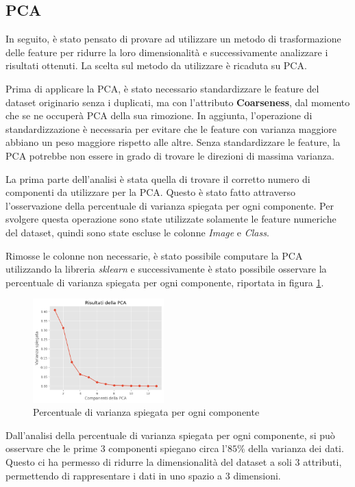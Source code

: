 \subsection{PCA} \label{sec:pca}
In seguito, è stato pensato di provare ad utilizzare un metodo di trasformazione
delle feature per ridurre la loro dimensionalità e successivamente analizzare i
risultati ottenuti. La scelta sul metodo da utilizzare è ricaduta su PCA.

Prima di applicare la PCA, è stato necessario standardizzare le feature del dataset
originario senza i duplicati, ma con l'attributo \textbf{Coarseness}, dal momento
che se ne occuperà PCA della sua rimozione. In aggiunta, l'operazione di 
standardizzazione è necessaria per evitare che le feature con varianza maggiore 
abbiano un peso maggiore rispetto alle altre. Senza standardizzare le feature, 
la PCA potrebbe non essere in grado di trovare le direzioni di massima varianza.

La prima parte dell'analisi è stata quella di trovare il corretto numero di
componenti da utilizzare per la PCA. Questo è stato fatto attraverso
l'osservazione della percentuale di varianza spiegata per ogni componente. Per
svolgere questa operazione sono state utilizzate solamente le feature numeriche
del dataset, quindi sono state escluse le colonne \textit{Image} e \textit{Class}.

Rimosse le colonne non necessarie, è stato possibile computare la PCA utilizzando
la libreria \textit{sklearn} e successivamente è stato possibile osservare la
percentuale di varianza spiegata per ogni componente, riportata in figura \ref{fig:pca}.

\begin{figure}[!ht]
      \centering
      \includegraphics[width=0.45\textwidth]{img/analisi/pcaVarianza.png}
      \caption{Percentuale di varianza spiegata per ogni componente}
      \label{fig:pca}
\end{figure}

Dall'analisi della percentuale di varianza spiegata per ogni componente, si può
osservare che le prime $3$ componenti spiegano circa l'$85\%$ della varianza
dei dati. Questo ci ha permesso di ridurre la dimensionalità del dataset a soli
$3$ attributi, permettendo di rappresentare i dati in uno spazio a $3$ dimensioni.

